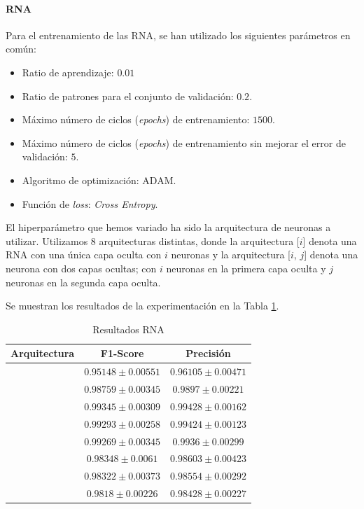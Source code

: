 \documentclass[12pt]{article}
\begin{document}
\paragraph{RNA}

Para el entrenamiento de las RNA, se han utilizado los siguientes parámetros en común:
\begin{itemize}
	\item Ratio de aprendizaje: $0.01$
	\item Ratio de patrones para el conjunto de validación: $0.2$.
	\item Máximo número de ciclos (\textit{epochs}) de entrenamiento: $1500$.
	\item Máximo número de ciclos (\textit{epochs}) de entrenamiento sin mejorar el error de validación: $5$.
	\item Algoritmo de optimización: ADAM.
	\item Función de \textit{loss}: \textit{Cross Entropy}.
\end{itemize}
El hiperparámetro que hemos variado ha sido la arquitectura de neuronas a utilizar. Utilizamos 8 arquitecturas distintas,
donde la arquitectura [$i$] denota una RNA con una única capa oculta con $i$ neuronas y la arquitectura [$i$, $j$] 
denota una neurona con dos capas ocultas; con $i$ neuronas en la primera capa oculta y $j$ neuronas en la segunda capa oculta.

Se muestran los resultados de la experimentación en la Tabla \ref{Tab:ANN_3}.

\begin{table}[!ht]
	\caption{Resultados RNA}
	\centering
		 \begin{tabular}{||c c c||}
			 \hline
			 Arquitectura & F1-Score & Precisión  \\ [0.5ex]
			 \hline\hline
		[16] & $0.95148 \pm 0.00551$ & $0.96105 \pm 0.00471$ \\
		\hline 
		[32] & $0.98759 \pm 0.00345$ & $0.9897 \pm 0.00221$ \\
		\hline 
		[64] & $0.99345 \pm 0.00309$ & $0.99428 \pm 0.00162$ \\
		\hline 
		[128] & $0.99293 \pm 0.00258$ & $0.99424 \pm 0.00123$ \\
		\hline 
		[256] & $0.99269 \pm 0.00345$ & $0.9936 \pm 0.00299$ \\
		\hline 
		[512] & $0.98348 \pm 0.0061$ & $0.98603 \pm 0.00423$ \\
		\hline 
		[64, 64] & $0.98322 \pm 0.00373$ & $0.98554 \pm 0.00292$ \\
		\hline 
		[64, 128] & $0.9818 \pm 0.00226$ & $0.98428 \pm 0.00227$ \\
		\hline 
		 \end{tabular}
	\label{Tab:ANN_3}
	\end{table}
\end{document}
